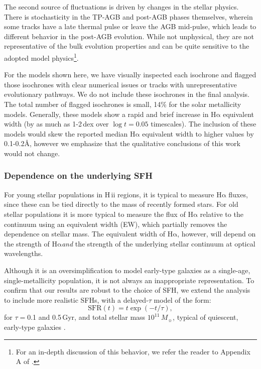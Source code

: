 \documentclass[preprint2]{aastex62}
\newcommand{\hii}{H\,{\sc ii}\xspace}
\newcommand\Msun{\ensuremath{\,M_{\sun}}\xspace}
\newcommand{\ha}{\ensuremath{\mathrm{H\alpha}}\xspace}
\newcommand{\ang}{\ensuremath{\mbox{\AA}}\xspace}
\newcommand{\Gyr}{$\,$Gyr\xspace}
\begin{document}
The second source of fluctuations is driven by changes in the stellar physics. There is stochasticity in the TP-AGB and post-AGB phases themselves, wherein some tracks have a late thermal pulse or leave the AGB mid-pulse, which leads to different behavior in the post-AGB evolution. While not unphysical, they are not representative of the bulk evolution properties and can be quite sensitive to the adopted model physics\footnote{For an in-depth discussion of this behavior, we refer the reader to Appendix A of \citet{Choi+2016}.}.

For the models shown here, we have visually inspected each isochrone and flagged those isochrones with clear numerical issues or tracks with unrepresentative evolutionary pathways. We do not include these isochrones in the final analysis. The total number of flagged isochrones is small, 14\% for the solar metallicity models. Generally, these models show a rapid and brief increase in \ha equivalent width (by as much as 1-2\,dex over $\log t = 0.05$ timescales). The inclusion of these models would skew the reported median \ha equivalent width to higher values by 0.1-0.2\ang, however we emphasize that the qualitative conclusions of this work would not change.

\subsubsection{Dependence on the underlying SFH} \label{sec:stars:emis:continuum}

For young stellar populations in \hii regions, it is typical to measure \ha fluxes, since these can be tied directly to the mass of recently formed stars. For old stellar populations it is more typical to measure the flux of \ha relative to the continuum using an equivalent width (EW), which partially removes the dependence on stellar mass. The equivalent width of \ha, however, will depend on the strength of \ha \emph{and} the strength of the underlying stellar continuum at optical wavelengths. %

Although it is an oversimplification to model early-type galaxies as a single-age, single-metallicity population, it is not always an inappropriate representation. To confirm that our results are robust to the choice of SFH, we extend the analysis to include more realistic SFHs, with a delayed-$\tau$ model of the form:
\begin{equation}
    \mathrm{SFR}(t) = t \exp (-t/\tau),
\end{equation}
for $\tau = $0.1 and 0.5\Gyr, and total stellar mass $10^{11}$\Msun, typical of quiescent, early-type galaxies \citep{Thomas+2005, Choi+2014}.
\end{document}
